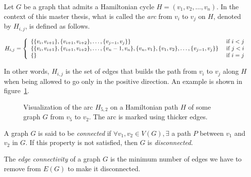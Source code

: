 \begin{definition}
    \label{def:arc}
    Let $G$ be a graph that admits a Hamiltonian cycle $H = (v_1, v_2, \dots, v_n)$.
    In the context of this master thesis, what is called the \textit{arc} from $v_i$ to $v_j$ on $H$, denoted by $H_{i, j}$, is defined as follows.
    
    \begin{center}
        $H_{i, j} = \left\{\begin{array}{l l}
            \left\{\{v_i, v_{i+1}\}, \{v_{i+1}, v_{i+2}\}, \dots, \{v_{j-1}, v_j\}\right\}                                                       & \mbox{ if } i < j \\
            \left\{\{v_i, v_{i+1}\}, \{v_{i+1}, v_{i+2}\}, \dots, \{v_n - 1, v_n\},  \{v_n, v_1\}, \{v_1, v_2\}, \dots, \{v_{j-1}, v_j\}\right\} & \mbox{ if } j < i \\
            \left\{\right\}                                                                                                                      & \mbox{ if } i = j
        \end{array}\right.$
    \end{center}
    
    In other words, $H_{i, j}$ is the set of edges that builds the path from $v_i$ to $v_j$ along $H$ when being allowed to go only in the positive direction.
    An example is shown in figure~\ref{fig:H_i_j}.

    \begin{figure}[H]
        \caption{Visualization of the arc $H_{5, 2}$ on a Hamiltonian path $H$ of some graph $G$ from $v_5$ to $v_2$. The arc is marked using thicker edges.}
        \label{fig:H_i_j}
    \end{figure}
    
\end{definition}

\begin{definition}
    \label{def:connected_graph}
    A graph $G$ is said to be \textit{connected} if $\forall v_1, v_2 \in V(G), \exists$ a path $P$ between $v_1$ and $v_2$ in $G$.
    If this property is not satisfied, then $G$ is \textit{disconnected}.
\end{definition}

\begin{definition}
    \label{def:edge_connectivity}
    The \textit{edge connectivity} of a graph $G$ is the minimum number of edges we have to remove from $E(G)$ to make it disconnected.
\end{definition}

